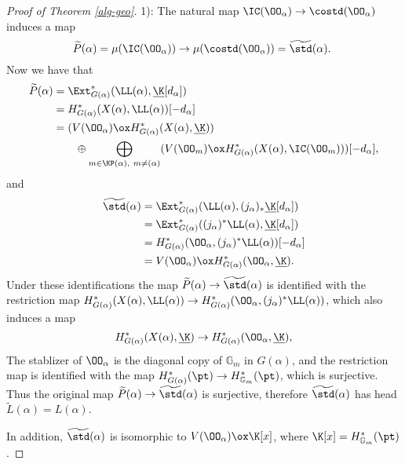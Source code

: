 \begin{proof}[Proof of Theorem \ref{alg-geo}]
    1): The natural map $\IC(\OO_{\alpha})\to\costd(\OO_{\alpha})$
    induces a map 
    \[
        \widetilde{P}(\alpha) = \mu(\IC(\OO_{\alpha}))
        \to\mu(\costd(\OO_{\alpha})) = \widetilde{\std}(\alpha).\
    \]
    Now we have that 
    \[
    \begin{aligned}
        \widetilde{P}(\alpha)
        & = \Ext^*_{G(\alpha)}(\LL(\alpha),\underline{\K}[d_{\alpha}])\\
        & = H^*_{G(\alpha)}(X(\alpha),\LL(\alpha))[-d_{\alpha}]\\
        & = (V(\OO_\alpha)\ox H^*_{G(\alpha)}(X(\alpha),\underline{\K}))\\
        &\qquad\oplus\bigoplus_{m\in\KP(\alpha),\ m\ne(\alpha)}
        (V(\OO_m)\ox H^*_{G(\alpha)}(X(\alpha),\IC(\OO_m)))[-d_\alpha],
    \end{aligned}
    \] 
    and 
    \[
    \begin{aligned}
        \widetilde{\std}(\alpha)
        & = \Ext^*_{G(\alpha)}(\LL(\alpha),(j_\alpha)_*\underline{\K}[d_{\alpha}])\\
        & = \Ext^*_{G(\alpha)}((j_\alpha)^*\LL(\alpha),\underline{\K}[d_{\alpha}])\\
        & = H^*_{G(\alpha)}(\OO_\alpha,(j_\alpha)^*\LL(\alpha))[-d_{\alpha}]\\
        & = V(\OO_\alpha)\ox H^*_{G(\alpha)}(\OO_\alpha,\underline{\K}).
    \end{aligned}
    \] 
    Under these identifications the map 
    $\widetilde{P}(\alpha)\to\widetilde{\std}(\alpha)$ 
    is identified with the restriction map $H^*_{G(\alpha)}(X(\alpha),\LL(\alpha))
    \to H^*_{G(\alpha)}(\OO_\alpha,(j_\alpha)^*\LL(\alpha))$, which also induces 
    a map 
    \[
    H^*_{G(\alpha)}(X(\alpha),\underline{\K})\to 
    H^*_{G(\alpha)}(\OO_\alpha,\underline{\K}),
    \] The stablizer of
    $\OO_\alpha$ is the diagonal copy of $\mathbb{G}_m$ in $G(\alpha)$,
    and the restriction map is identified with the map
    $H^*_{G(\alpha)}(\pt)\to H^*_{\mathbb{G}_m}(\pt)$, which is surjective.
    Thus the original map $\widetilde{P}(\alpha)\to\widetilde{\std}(\alpha)$ 
    is surjective, therefore $\widetilde{\std}(\alpha)$
    has head $\widetilde{L}(\alpha) = L(\alpha)$.

    In addition, $\widetilde{\std}(\alpha)$ is isomorphic to
    $V(\OO_\alpha)\ox\K[x]$, where $\K[x] = H^*_{\mathbb{G}_m}(\pt)$.


\end{proof}
